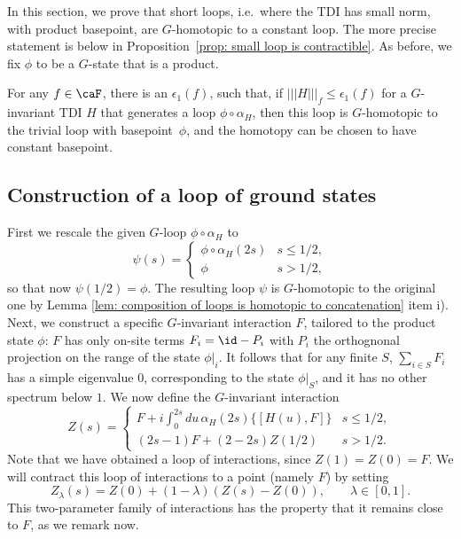 In this section, we prove that short loops, i.e.\ where the TDI has small norm, with product basepoint, are $G$-homotopic to a constant loop. The more precise statement is below in Proposition~\ref{prop: small loop is contractible}.  As before, we fix $\phi$ to be a $G$-state that is a product.
%
%
%
\begin{proposition}\label{prop: small loop is contractible}
	For any $f\in\caF$, there is an $\epsilon_1(f)$, such that, if $|||H|||_f\leq \epsilon_1(f)$ for a $G$-invariant TDI $H$ that generates a loop $\phi\circ\alpha_H$, then this loop is $G$-homotopic to the trivial loop with basepoint~$\phi$, and the homotopy can be chosen to have constant basepoint. 
\end{proposition}
%
%
%
%
%
%
\subsection{Construction of a loop of ground states}\label{sec: construction of loop of gs}
First we rescale the given $G$-loop $\phi\circ\alpha_H$ to
\begin{equation}
	\psi(s)=\begin{cases}  \phi\circ\alpha_H(2s)  &  s\leq 1/2, \\  
		\phi &   s>1/2,
	\end{cases}
\end{equation}
so that now $\psi(1/2)=\phi$. The resulting loop $\psi$ is $G$-homotopic to the original one by Lemma \ref{lem: composition of loops is homotopic to concatenation} item i).  Next, we construct a specific $G$-invariant interaction $F$, tailored to the product state $\phi$:
$F$ has only on-site terms $F_i= \id-P_i$ with $P_i$ the orthognonal projection on the range of the state $\phi|_i$. It follows that for any finite $S$, $\sum_{i \in S} F_i$ has a simple eigenvalue $0$, corresponding to the state $\phi|_S$, and it has no other spectrum below $1$.  
We now define the $G$-invariant interaction
$$
Z(s)= \begin{cases}  F+i\int_0^{2s} du\,\alpha_H(2s)\{[H(u),F]\} & s \leq 1/2,  \\[2mm]
	(2s-1)F+    (2-2s)Z(1/2)   & s >1/2.
\end{cases}
$$
Note that we have obtained a loop of interactions, since $Z(1)=Z(0)=F$.
We will contract this loop of interactions to a point (namely $F$) by setting
$$
Z_{\lambda}(s)  =Z(0)+ (1-\lambda)( Z(s)-Z(0)), \qquad  \lambda \in [0,1].
$$ 
This two-parameter family of interactions has the property that it remains close to $F$, as we remark now. 
